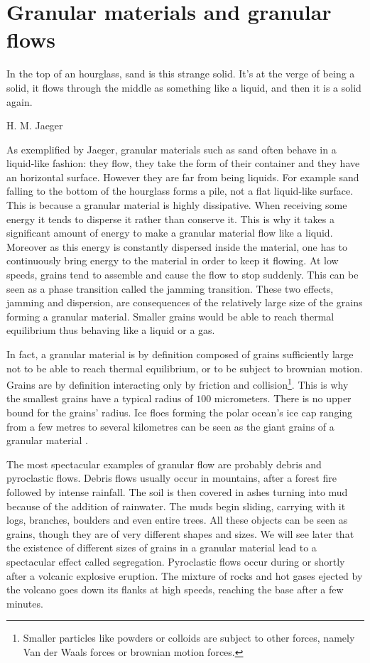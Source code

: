 


\section{Granular materials and granular flows}

\epigraph{In the top of an hourglass, sand is this strange solid. It's at the verge of being a solid, it flows through the middle as something like a liquid, and then it is a solid again.}{H. M. Jaeger}

As exemplified by Jaeger, granular materials such as sand often behave in a liquid-like fashion: they flow, they take the form of their container and they have an horizontal surface. However they are far from being liquids. For example sand falling to the bottom of the hourglass forms a pile, not a flat liquid-like surface.
This is because a granular material is highly dissipative. When receiving some energy it tends to disperse it rather than conserve it. This is why it takes a significant amount of energy to make a granular material flow like a liquid. Moreover as this energy is constantly dispersed inside the material, one has to continuously bring energy to the material in order to keep it flowing. 
At low speeds, grains tend to assemble and cause the flow to stop suddenly. This can be seen as a phase transition called the jamming transition.
These two effects, jamming and dispersion, are consequences of the relatively large size of the grains forming a granular material. Smaller grains would be able to reach thermal equilibrium thus behaving like a liquid or a gas.

In fact, a granular material is by definition composed of grains sufficiently large not to be able to reach thermal equilibrium, or to be subject to brownian motion. Grains are by definition interacting only by friction and collision\footnote{Smaller particles like powders or colloids are subject to other forces, namely Van der Waals forces or brownian motion forces.}.
This is why the smallest grains have a typical radius of $100$ micrometers.
There is no upper bound for the grains' radius. Ice floes forming the polar ocean's ice cap ranging from a few metres to several kilometres can be seen as the giant grains of a granular material \cite{ice}.

The most spectacular examples of granular flow are probably debris and pyroclastic flows.
Debris flows usually occur in mountains, after a forest fire followed by intense rainfall. The soil is then covered in ashes turning into mud because of the addition of rainwater. The muds begin sliding, carrying with it logs, branches, boulders and even entire trees. All these objects can be seen as grains, though they are of very different shapes and sizes. We will see later that the existence of different sizes of grains in a granular material lead to a spectacular effect called segregation.
Pyroclastic flows occur during or shortly after a volcanic explosive eruption. The mixture of rocks and hot gases ejected by the volcano goes down its flanks at high speeds, reaching the base after a few minutes.

